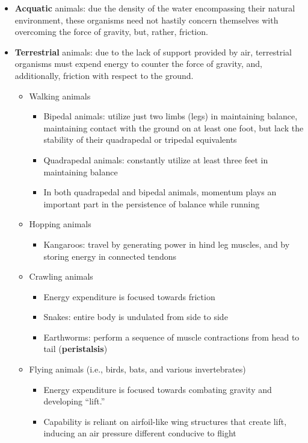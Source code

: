 \documentclass{article}
\begin{document}
\begin{itemize}
    \item \textbf{Acquatic} animals: due the density of the water encompassing their
    natural environment, these organisms need not hastily concern themselves with
    overcoming the force of gravity, but, rather, friction.
    \item \textbf{Terrestrial} animals: due to the lack of support provided by air,
    terrestrial organisms must expend energy to counter the force of gravity,
    and, additionally, friction with respect to the ground.
    \begin{itemize}
        \item Walking animals
            \begin{itemize}
                \item Bipedal animals: utilize just two limbs (legs) in
                maintaining balance, maintaining contact with the ground on at
                least one foot, but lack the stability of their quadrapedal or
                tripedal equivalents
                \item Quadrapedal animals: constantly utilize at least three feet
                in maintaining balance
                \item In both quadrapedal and bipedal animals, momentum plays
                an important part in the persistence of balance while running
            \end{itemize}
        \item Hopping animals
            \begin{itemize}
              \item Kangaroos: travel by generating power in hind leg muscles,
                and by storing energy in connected tendons
            \end{itemize}
        \item Crawling animals
            \begin{itemize}
                \item Energy expenditure is focused towards friction
                \item Snakes: entire body is undulated from side to side
                \item Earthworms: perform a sequence of muscle contractions from
                head to tail (\textbf{peristalsis})
            \end{itemize}
        \item Flying animals (i.e., birds, bats, and various invertebrates)
            \begin{itemize}
                \item Energy expenditure is focused towards combating gravity
                and developing ``lift.''
              \item Capability is reliant on airfoil-like wing structures that
                create lift, inducing an air pressure different conducive to
                flight
            \end{itemize}
    \end{itemize}
\end{itemize}
\end{document}
